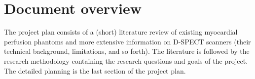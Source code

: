 \section{Document overview}
\label{sec:doc_overview}
The project plan consists of a (short) literature review of existing myocardial perfusion phantoms and more extensive information on D-SPECT scanners (their technical background, limitations, and so forth). The literature is followed by the research methodology containing the research questions and goals of the project. The detailed planning is the last section of the project plan.